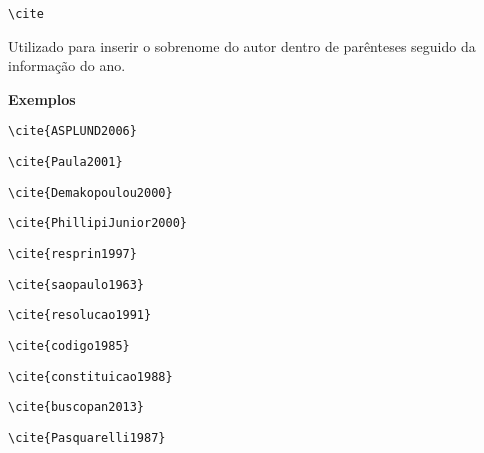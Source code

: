 \begin{alineas}
\item
\begin{verbatim}
\cite
\end{verbatim}

Utilizado para inserir o sobrenome do autor dentro de parênteses seguido da informação do ano.

\textbf{Exemplos} 

\begin{verbatim}
\cite{ASPLUND2006}
\end{verbatim}
\cite{ASPLUND2006}

\begin{verbatim}
\cite{Paula2001}
\end{verbatim}
\cite{Paula2001}

\begin{verbatim}
\cite{Demakopoulou2000}
\end{verbatim}
\cite{Demakopoulou2000}

\begin{verbatim}
\cite{PhillipiJunior2000}
\end{verbatim}
\cite{PhillipiJunior2000}

\begin{verbatim}
\cite{resprin1997}
\end{verbatim}
\cite{resprin1997}

\begin{verbatim}
\cite{saopaulo1963}
\end{verbatim}
\cite{saopaulo1963}

\begin{verbatim}
\cite{resolucao1991}
\end{verbatim}
\cite{resolucao1991}

\begin{verbatim}
\cite{codigo1985}
\end{verbatim}
\cite{codigo1985}

\begin{verbatim}
\cite{constituicao1988}
\end{verbatim}
\cite{constituicao1988}

\begin{verbatim}
\cite{buscopan2013}
\end{verbatim}
\cite{buscopan2013}

\begin{verbatim}
\cite{Pasquarelli1987}
\end{verbatim}
\cite{Pasquarelli1987}\\


\end{alineas}
